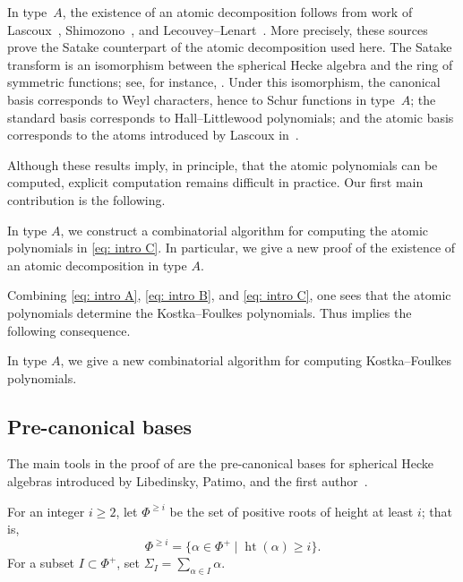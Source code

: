 In type~$A$, the existence of an atomic decomposition follows from work of Lascoux~\cite{lascoux1989cyclic}, Shimozono~\cite{shimozono2001multi}, and Lecouvey--Lenart~\cite{lecouvey2021atomic}. More precisely, these sources prove the Satake counterpart of the atomic decomposition used here. The Satake transform is an isomorphism between the spherical Hecke algebra and the ring of symmetric functions; see, for instance, \cite{stembridgekostka}. Under this isomorphism, the canonical basis corresponds to Weyl characters, hence to Schur functions in type~$A$; the standard basis corresponds to Hall--Littlewood polynomials; and the atomic basis corresponds to the atoms introduced by Lascoux in~\cite{lascoux1989cyclic}.

Although these results imply, in principle, that the atomic polynomials can be computed, explicit computation remains difficult in practice. Our first main contribution is the following.

\begin{introtheorem}\label{Teo A}
    In type $A$, we construct a combinatorial algorithm for computing the atomic polynomials in \eqref{eq: intro C}. In particular, we give a new proof of the existence of an atomic decomposition in type $A$.
\end{introtheorem}

Combining \eqref{eq: intro A}, \eqref{eq: intro B}, and \eqref{eq: intro C}, one sees that the atomic polynomials determine the Kostka--Foulkes polynomials. Thus  implies the following consequence.

\begin{introtheorem} \label{Teo B}
     In type $A$, we give a new combinatorial algorithm for computing Kostka--Foulkes polynomials.
\end{introtheorem}

\subsection{Pre-canonical bases}

The main tools in the proof of  are the pre-canonical bases for spherical Hecke algebras introduced by Libedinsky, Patimo, and the first author~\cite{LPP}.

For an integer $i\geq 2$, let $\Phi^{\geq i}$ be the set of positive roots of height at least $i$; that is,
\[
    \Phi^{\geq i}=\{\alpha\in\Phi^+\mid \operatorname{ht}(\alpha)\geq i\}.
\]
For a subset $I\subset \Phi^+$, set $\Sigma_I=\sum_{\alpha\in I}\alpha$.

